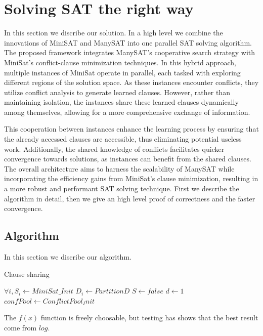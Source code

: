 \documentclass{article}
\begin{document}
\section{Solving SAT the right way}
\label{sec:methodology}

In this section we discribe our solution. In a high level we combine the innovations of MiniSAT \cite{MiniSAT} and ManySAT \cite{ManySAT} into one parallel SAT solving algorithm. The proposed framework integrates ManySAT's cooperative search strategy with MiniSat's conflict-clause minimization techniques. In this hybrid approach, multiple instances of MiniSat operate in parallel, each tasked with exploring different regions of the solution space. As these instances encounter conflicts, they utilize conflict analysis to generate learned clauses. However, rather than maintaining isolation, the instances share these learned clauses dynamically among themselves, allowing for a more comprehensive exchange of information.

This cooperation between instances enhance the learning process by ensuring that the already accessed clauses are accessible, thus eliminating potential useless work. Additionally, the shared knowledge of conflicts facilitates quicker convergence towards solutions, as instances can benefit from the shared clauses. The overall architecture aims to harness the scalability of ManySAT while incorporating the efficiency gains from MiniSat's clause minimization, resulting in a more robust and performant SAT solving technique. First we describe the algorithm in detail, then we give an high level proof of correctness and the faster convergence.

\subsection{Algorithm}
In this section we discribe our algorithm.

\begin{algorithm}
\caption{Clause sharing}\label{alg:cap}
 $\forall i, S_i \gets MiniSat\_Init$ \;
 $D_i \gets Partition D$\;
 $S \gets false$\;
 $d \gets 1$
 $confPool \gets ConflictPool_Init$\;
\end{algorithm}

The $f(x)$ function is freely choosable, but testing has shows that the best result come from $log$.
\end{document}
